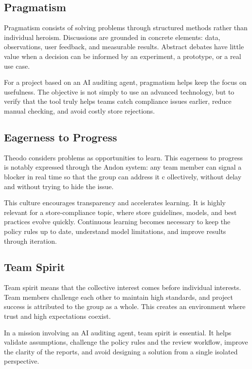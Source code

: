 \subsection{Pragmatism}

Pragmatism consists of solving problems through structured methods rather than individual heroism. Discussions are grounded in concrete elements: data, observations, user feedback, and measurable results. Abstract debates have little value when a decision can be informed by an experiment, a prototype, or a real use case.

For a project based on an AI auditing agent, pragmatism helps keep the focus on usefulness. The objective is not simply to use an advanced technology, but to verify that the tool truly helps teams catch compliance issues earlier, reduce manual checking, and avoid costly store rejections.

\subsection{Eagerness to Progress}

Theodo considers problems as opportunities to learn. This eagerness to progress is notably expressed through the Andon system: any team member can signal a blocker in real time so that the group can address it c	ollectively, without delay and without trying to hide the issue.

This culture encourages transparency and accelerates learning. It is highly relevant for a store-compliance topic, where store guidelines, models, and best practices evolve quickly. Continuous learning becomes necessary to keep the policy rules up to date, understand model limitations, and improve results through iteration.

\subsection{Team Spirit}

Team spirit means that the collective interest comes before individual interests. Team members challenge each other to maintain high standards, and project success is attributed to the group as a whole. This creates an environment where trust and high expectations coexist.

In a mission involving an AI auditing agent, team spirit is essential. It helps validate assumptions, challenge the policy rules and the review workflow, improve the clarity of the reports, and avoid designing a solution from a single isolated perspective.

